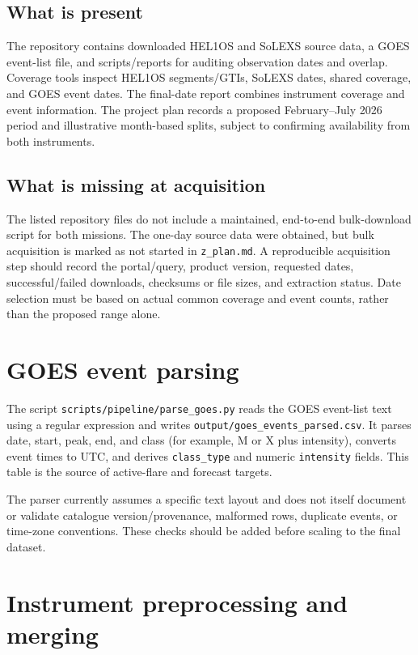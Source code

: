 \documentclass[11pt,a4paper]{article}
\begin{document}
\subsection{What is present}
The repository contains downloaded HEL1OS and SoLEXS source data, a GOES event-list file, and scripts/reports for auditing observation dates and overlap. Coverage tools inspect HEL1OS segments/GTIs, SoLEXS dates, shared coverage, and GOES event dates. The final-date report combines instrument coverage and event information. The project plan records a proposed February--July 2026 period and illustrative month-based splits, subject to confirming availability from both instruments.

\subsection{What is missing at acquisition}
The listed repository files do not include a maintained, end-to-end bulk-download script for both missions. The one-day source data were obtained, but bulk acquisition is marked as not started in \texttt{z\_plan.md}. A reproducible acquisition step should record the portal/query, product version, requested dates, successful/failed downloads, checksums or file sizes, and extraction status. Date selection must be based on actual common coverage and event counts, rather than the proposed range alone.

\section{GOES event parsing}

The script \texttt{scripts/pipeline/parse\_goes.py} reads the GOES event-list text using a regular expression and writes \texttt{output/goes\_events\_parsed.csv}. It parses date, start, peak, end, and class (for example, M or X plus intensity), converts event times to UTC, and derives \texttt{class\_type} and numeric \texttt{intensity} fields. This table is the source of active-flare and forecast targets.

The parser currently assumes a specific text layout and does not itself document or validate catalogue version/provenance, malformed rows, duplicate events, or time-zone conventions. These checks should be added before scaling to the final dataset.

\section{Instrument preprocessing and merging}
\end{document}
